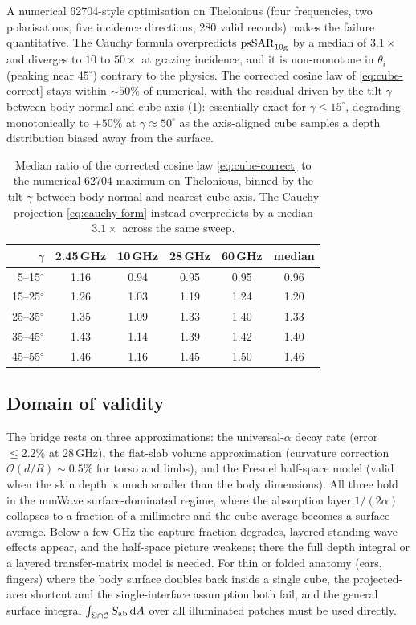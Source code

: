 A numerical 62704-style optimisation on Thelonious (four frequencies, two
polarisations, five incidence directions, 280 valid records) makes the failure
quantitative. The Cauchy formula overpredicts $\mathrm{psSAR}_{10\mathrm{g}}$ by a median of
$3.1\times$ and diverges to $10$ to $50\times$ at grazing incidence, and it is
non-monotone in $\theta_i$ (peaking near $45^\circ$) contrary to the physics.
The corrected cosine law of \cref{eq:cube-correct} stays within $\sim 50\%$ of
numerical, with the residual driven by the tilt $\gamma$ between body normal and
cube axis (\cref{tab:pssar-cube}): essentially exact for $\gamma\le 15^\circ$,
degrading monotonically to $+50\%$ at $\gamma\approx 50^\circ$ as the
axis-aligned cube samples a depth distribution biased away from the surface.

\begin{table}[ht]
\centering
\caption{Median ratio of the corrected cosine law \cref{eq:cube-correct} to the
numerical 62704 maximum on Thelonious, binned by the tilt $\gamma$ between body
normal and nearest cube axis. The Cauchy projection \cref{eq:cauchy-form}
instead overpredicts by a median $3.1\times$ across the same sweep.}
\label{tab:pssar-cube}
\begin{tabular}{@{}rccccc@{}}
\toprule
$\gamma$ & 2.45\,GHz & 10\,GHz & 28\,GHz & 60\,GHz & median \\
\midrule
5--15$^\circ$  & 1.16 & 0.94 & 0.95 & 0.95 & 0.96 \\
15--25$^\circ$ & 1.26 & 1.03 & 1.19 & 1.24 & 1.20 \\
25--35$^\circ$ & 1.35 & 1.09 & 1.33 & 1.40 & 1.33 \\
35--45$^\circ$ & 1.43 & 1.14 & 1.39 & 1.42 & 1.40 \\
45--55$^\circ$ & 1.46 & 1.16 & 1.45 & 1.50 & 1.46 \\
\bottomrule
\end{tabular}
\end{table}

\subsection{Domain of validity}
\label{sec:pssar-domain}

The bridge rests on three approximations: the universal-$\alpha$ decay rate
(error $\le 2.2\%$ at 28\,GHz), the flat-slab volume approximation (curvature
correction $\mathcal{O}(d/R)\sim 0.5\%$ for torso and limbs), and the Fresnel
half-space model (valid when the skin depth is much smaller than the body
dimensions). All three hold in the mmWave surface-dominated regime, where the
absorption layer $1/(2\alpha)$ collapses to a fraction of a millimetre and the
cube average becomes a surface average. Below a few GHz the capture fraction
degrades, layered standing-wave effects appear, and the half-space picture
weakens; there the full depth integral or a layered transfer-matrix model is
needed. For thin or folded anatomy (ears, fingers) where the body surface
doubles back inside a single cube, the projected-area shortcut and the
single-interface assumption both fail, and the general surface integral
$\int_{\Sigma\cap\mathcal{C}}S_{\mathrm{ab}}\,\mathrm{d} A$ over all illuminated patches must be
used directly.
